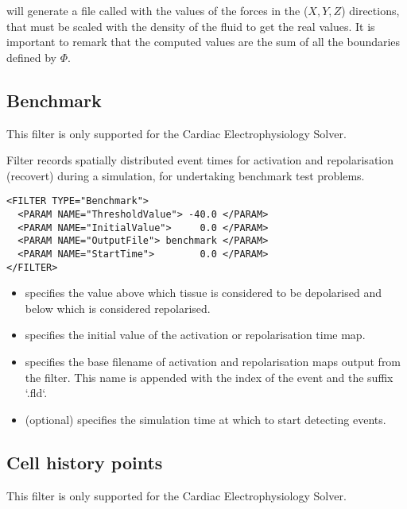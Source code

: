 will generate a file called  with the values of the forces
in the ($X,Y,Z$) directions, that must be scaled with the density of the
fluid to get the real values. It is important to remark that the computed
values are the sum of all the boundaries defined by $\Phi$.

\subsection{Benchmark}\label{filters:Benchmark}

\begin{notebox}
  This filter is only supported for the Cardiac Electrophysiology Solver.
\end{notebox}

Filter  records spatially distributed event times for 
    activation and repolarisation (recovert) during a simulation, for
    undertaking benchmark test problems.
\begin{lstlisting}[style=XmlStyle]
<FILTER TYPE="Benchmark">
  <PARAM NAME="ThresholdValue"> -40.0 </PARAM>
  <PARAM NAME="InitialValue">     0.0 </PARAM>
  <PARAM NAME="OutputFile"> benchmark </PARAM>
  <PARAM NAME="StartTime">        0.0 </PARAM>
</FILTER>
\end{lstlisting}
    \begin{itemize}
        \item {} specifies the value above which tissue is
            considered to be depolarised and below which is considered
            repolarised.
        \item {} specifies the initial value of the
            activation or repolarisation time map.
        \item {} specifies the base filename of activation and
            repolarisation maps output from the filter. This name is appended
            with the index of the event and the suffix `.fld`.
        \item {} (optional) specifies the simulation time at
            which to start detecting events.
    \end{itemize}


\subsection{Cell history points}\label{filters:CellHistoryPoints}

\begin{notebox}
  This filter is only supported for the Cardiac Electrophysiology Solver.
\end{notebox}

